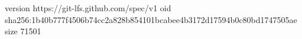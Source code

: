 version https://git-lfs.github.com/spec/v1
oid sha256:1b40b777f4506b74cc2a828b854101bcabee4b3172d17594b0c80bd1747505ae
size 71501
